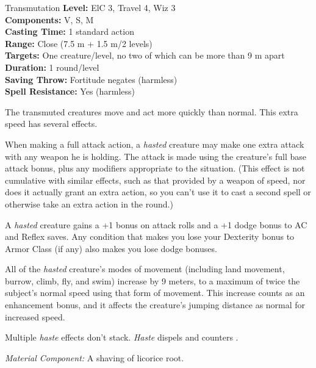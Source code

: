 {Transmutation}
{
	\textbf{Level:}
	ElC 3, Travel 4, Wiz 3\\
	\textbf{Components:}
	V, S, M\\
	\textbf{Casting Time:}
	1 standard action\\
	\textbf{Range:}
	Close (7.5 m + 1.5 m/2 levels)\\
	\textbf{Targets:}
	One creature/level, no two of which can be more than 9 m apart\\
	\textbf{Duration:}
	1 round/level\\
	\textbf{Saving Throw:}
	Fortitude negates (harmless)\\
	\textbf{Spell Resistance:}
	Yes (harmless)\\
}
{
	The transmuted creatures move and act more quickly than normal. This extra speed has several effects.

	When making a full attack action, a \emph{hasted} creature may make one extra attack with any weapon he is holding. The attack is made using the creature's full base attack bonus, plus any modifiers appropriate to the situation. (This effect is not cumulative with similar effects, such as that provided by a weapon of speed, nor does it actually grant an extra action, so you can't use it to cast a second spell or otherwise take an extra action in the round.)

	A \emph{hasted} creature gains a +1 bonus on attack rolls and a +1 dodge bonus to AC and Reflex saves. Any condition that makes you lose your Dexterity bonus to Armor Class (if any) also makes you lose dodge bonuses.

	All of the \emph{hasted} creature's modes of movement (including land movement, burrow, climb, fly, and swim) increase by 9 meters, to a maximum of twice the subject's normal speed using that form of movement. This increase counts as an enhancement bonus, and it affects the creature's jumping distance as normal for increased speed.

	Multiple \emph{haste} effects don't stack. \emph{Haste} dispels and counters .

	\textit{Material Component:}
	A shaving of licorice root.

}
